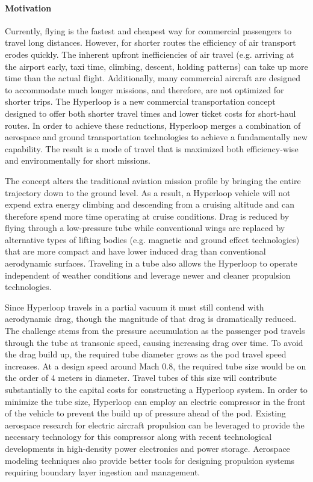 \paragraph{Motivation}

    Currently, flying is the fastest and cheapest way for commercial
    passengers to travel long distances. However, for shorter routes the
    efficiency of air transport erodes quickly.
    The inherent upfront inefficiencies of air travel (e.g. arriving at the
    airport early, taxi time, climbing, descent, holding patterns)
    can take up more time than the actual flight.
    Additionally, many commercial aircraft are designed to accommodate much longer
    missions, and therefore, are not optimized for shorter trips.
    The Hyperloop is a new commercial transportation concept designed to offer
    both shorter travel times and lower ticket costs for short-haul routes.
    In order to achieve these reductions, Hyperloop merges a
    combination of aerospace and ground transportation technologies to achieve
    a fundamentally new capability. The result is a mode of travel that is
    maximized both efficiency-wise and environmentally for short missions.

    The concept alters the traditional aviation mission profile by bringing
    the entire trajectory down to the ground level.
    As a result, a Hyperloop vehicle will not expend extra energy climbing
    and descending from a cruising altitude and can therefore spend more time
    operating at cruise conditions.
    Drag is reduced by flying through a low-pressure tube
    while conventional wings are replaced by alternative types of lifting bodies
    (e.g. magnetic and ground effect technologies) that are more compact and
    have lower induced drag than conventional aerodynamic surfaces.
    Traveling in a tube also allows the Hyperloop to operate independent of
    weather conditions and leverage newer and cleaner propulsion technologies.

    Since Hyperloop travels in a partial vacuum it must still contend with
    aerodynamic drag, though the magnitude of that drag is dramatically
    reduced. The challenge stems from the pressure accumulation as the passenger pod
    travels through the tube at transonic speed, causing increasing drag over time.
    To avoid the drag build up, the required tube diameter grows as the pod
    travel speed increases. At a design speed around Mach 0.8, the required tube
    size would be on the order of 4 meters in diameter. \cite{Chin}
    Travel tubes of this size will contribute
    substantially to the capital costs for constructing a Hyperloop system.
    In order to minimize the tube size, Hyperloop can employ an electric
    compressor in the front of the vehicle to prevent the build up
    of pressure ahead of the pod. Existing aerospace research for
    electric aircraft propulsion can be leveraged to provide the necessary
    technology for this compressor along with recent technological developments
    in high-density power electronics and power storage. Aerospace modeling
    techniques also provide better tools for designing propulsion systems
    requiring boundary layer ingestion and management.

